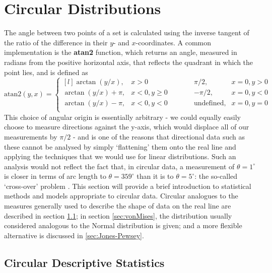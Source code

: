 \documentclass[../../ArchStats.tex]{subfiles}
\begin{document}
\nocite{Jammalamadaka2001}

\section{Circular Distributions}
\label{sec:circular-distributions}

The angle between two points of a set is calculated using the inverse tangent of the ratio of the difference in their $y$- and $x$-coordinates. A common implementation is the \textbf{atan2} function, which returns an angle, measured in radians from the positive horizontal axis, that reflects the quadrant in which the point lies, and is defined as
	\begin{equation}
	\label{eqn:atan2}
	\text{atan2} (y, x) = \left\lbrace \begin{matrix*}[l]
	\arctan(y/x), & x > 0 & \, \, \, \, &  \, \, \, \, &\pi/2, & x = 0, y > 0 \\
	\arctan(y/x) + \pi, & x < 0, y \geq 0 & \, \, \, \, &  \, \, \, \, &-\pi/2, & x = 0, y < 0 \\
	\arctan(y/x) - \pi, & x < 0, y < 0 & \, \, \, \, &  \, \, \, \, &\text{undefined}, & x = 0, y = 0 \\
	\end{matrix*} \right. 
	\end{equation}
This choice of angular origin is essentially arbitrary - we could equally easily choose to measure directions against the y-axis, which would displace all of our measurements by $\pi/2$ - and is one of the reasons that directional  data such as these cannot be analysed by simply `flattening' them onto the real line and applying the techniques that we would use for linear distributions. Such an analysis would not reflect the fact that, in circular data, a measurement of $\theta = 1^\circ$ is closer in terms of arc length to $\theta = 359^\circ$ than it is to $\theta = 5^\circ$: the so-called `cross-over' problem \cite{Fisher1993}. This section will provide a brief introduction to statistical methods and models appropriate to circular data. Circular analogues to the measures generally used to describe the shape of data on the real line are described in section \ref{sec:circular-descriptives}; in section \ref{sec:vonMises}, the distribution usually considered analogous to the Normal distribution is given; and a more flexible alternative is discussed in \ref{sec:Jones-Pewsey}.


\subsection{Circular Descriptive Statistics}
\label{sec:circular-descriptives}
\end{document}
